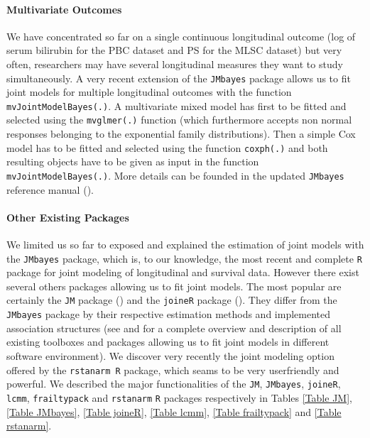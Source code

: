 \documentclass[12pt]{article}
\begin{document}
\paragraph{Multivariate Outcomes}
We have concentrated so far on a single continuous longitudinal outcome (log of serum bilirubin for the PBC dataset and PS for the MLSC dataset) but very often, researchers may have several longitudinal measures they want to study simultaneously. A very recent extension of the \texttt{JMbayes} package allows us to fit joint models for multiple longitudinal outcomes with the function
\texttt{mvJointModelBayes(.)}. A multivariate mixed model has first to be fitted and selected using the \texttt{mvglmer(.)} function (which furthermore accepts non normal responses belonging to the exponential family distributions). Then a simple Cox model has to be fitted and selected using the function \texttt{coxph(.)} and both resulting objects have to be given as input in the function \texttt{mvJointModelBayes(.)}. More details can be founded in the updated \texttt{JMbayes} reference manual (\cite{rizopoulos2017package}). 

\paragraph{Other Existing Packages}
We limited us so far to exposed and explained the estimation of joint models with the \texttt{JMbayes} package, which is, to our knowledge, the most recent and complete \texttt{R} package for joint modeling of longitudinal and survival data. However there exist several others packages allowing us to fit joint models. The most popular are certainly the \texttt{JM} package (\cite{JM}) and the \texttt{joineR} package (\cite{joiner_2017}). They differ from the \texttt{JMbayes} package by their respective estimation methods and implemented association structures (see \cite{gould_joint_2015} and \cite{Krol_2017} for a complete overview and description of all existing toolboxes and packages allowing us to fit joint models in different software environment). We discover very recently the joint modeling option offered by the \texttt{rstanarm R} package, which seams to be very userfriendly and powerful. We described the major functionalities of the \texttt{JM}, \texttt{JMbayes}, \texttt{joineR}, \texttt{lcmm}, \texttt{frailtypack} and \texttt{rstanarm} \texttt{R} packages respectively in Tables \ref{Table JM}, \ref{Table JMbayes}, \ref{Table joineR}, \ref{Table lcmm}, \ref{Table frailtypack} and \ref{Table rstanarm}.
\end{document}
